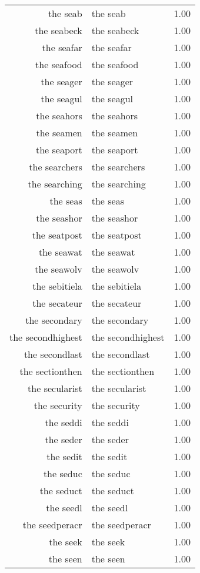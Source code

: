 \begin{table}[ht]
\begin{tabular}{rlr}
  the seab & the seab & 1.00 \\ 
  the seabeck & the seabeck & 1.00 \\ 
  the seafar & the seafar & 1.00 \\ 
  the seafood & the seafood & 1.00 \\ 
  the seager & the seager & 1.00 \\ 
  the seagul & the seagul & 1.00 \\ 
  the seahors & the seahors & 1.00 \\ 
  the seamen & the seamen & 1.00 \\ 
  the seaport & the seaport & 1.00 \\ 
  the searchers & the searchers & 1.00 \\ 
  the searching & the searching & 1.00 \\ 
  the seas & the seas & 1.00 \\ 
  the seashor & the seashor & 1.00 \\ 
  the seatpost & the seatpost & 1.00 \\ 
  the seawat & the seawat & 1.00 \\ 
  the seawolv & the seawolv & 1.00 \\ 
  the sebitiela & the sebitiela & 1.00 \\ 
  the secateur & the secateur & 1.00 \\ 
  the secondary & the secondary & 1.00 \\ 
  the secondhighest & the secondhighest & 1.00 \\ 
  the secondlast & the secondlast & 1.00 \\ 
  the sectionthen & the sectionthen & 1.00 \\ 
  the secularist & the secularist & 1.00 \\ 
  the security & the security & 1.00 \\ 
  the seddi & the seddi & 1.00 \\ 
  the seder & the seder & 1.00 \\ 
  the sedit & the sedit & 1.00 \\ 
  the seduc & the seduc & 1.00 \\ 
  the seduct & the seduct & 1.00 \\ 
  the seedl & the seedl & 1.00 \\ 
  the seedperacr & the seedperacr & 1.00 \\ 
  the seek & the seek & 1.00 \\ 
  the seen & the seen & 1.00 \\ 

\end{tabular}
\end{table}

